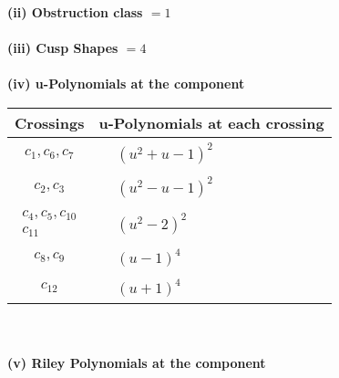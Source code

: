 \documentclass[1p]{elsarticle_modified}
\theoremstyle{definition}
\begin{document}
\flushleft \textbf{(ii) Obstruction class $= 1$}\\~\\
\flushleft \textbf{(iii) Cusp Shapes $= 4$}\\~\\
\newpage\renewcommand{\arraystretch}{1}
\flushleft \textbf{(iv) u-Polynomials at the component}\newline \\
\begin{tabular}{m{50pt}|m{274pt}}
Crossings & \hspace{64pt}u-Polynomials at each crossing \\
\hline $$\begin{aligned}c_{1},c_{6},c_{7}\end{aligned}$$&$\begin{aligned}
&(u^2+u-1)^2
\end{aligned}$\\
\hline $$\begin{aligned}c_{2},c_{3}\end{aligned}$$&$\begin{aligned}
&(u^2- u-1)^2
\end{aligned}$\\
\hline $$\begin{aligned}c_{4},c_{5},c_{10}\\c_{11}\end{aligned}$$&$\begin{aligned}
&(u^2-2)^2
\end{aligned}$\\
\hline $$\begin{aligned}c_{8},c_{9}\end{aligned}$$&$\begin{aligned}
&(u-1)^4
\end{aligned}$\\
\hline $$\begin{aligned}c_{12}\end{aligned}$$&$\begin{aligned}
&(u+1)^4
\end{aligned}$\\
\hline
\end{tabular}\\~\\
\newpage\renewcommand{\arraystretch}{1}
\flushleft \textbf{(v) Riley Polynomials at the component}\newline \\
\end{document}
